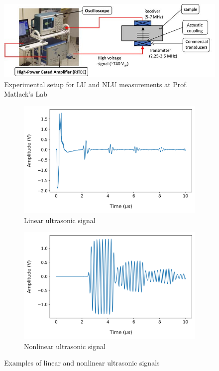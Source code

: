 \begin{figure}[tb]
  \centering
  \includegraphics[width=\linewidth]{fig/ultrasound setup.png}
  \caption{Experimental setup for LU and NLU measurements at Prof. Matlack's Lab}
  \label{fig: ultrasound setup}
\end{figure}

\begin{figure}[tb]
  \centering
  \begin{subfigure}[t]{0.49\linewidth}
    \includegraphics[width=\textwidth]{fig/lu_signal_raw.png}
    \caption{Linear ultrasonic signal}
    \label{fig: lu signal raw}
  \end{subfigure}
  \begin{subfigure}[t]{0.49\linewidth}
    \includegraphics[width=\textwidth]{fig/nlu_singal_raw.png}
    \caption{Nonlinear ultrasonic signal}
    \label{fig: nlu signal raw}
  \end{subfigure}

  \caption{Examples of linear and nonlinear ultrasonic signals}
  \label{fig: lu and nlu signals raw}
\end{figure}

